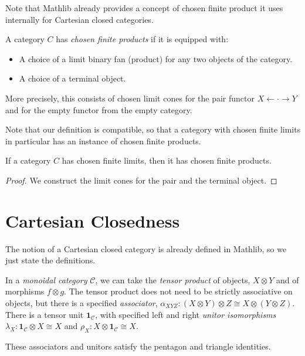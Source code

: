 Note that Mathlib already provides a concept of chosen finite product it uses internally for Cartesian closed categories.

\begin{definition}
  \label{def:chosen-finite-products}
  \mathlibok
  A category $C$ has \emph{chosen finite products} if it is equipped with:
  \begin{itemize}
  \item A choice of a limit binary fan (product) for any two objects of the category.
  \item A choice of a terminal object.
  \end{itemize}
  More precisely, this consists of chosen limit cones for the pair functor $X \leftarrow \cdot \rightarrow Y$ and for the empty functor from the empty category.
\end{definition}

Note that our definition is compatible, so that a category with chosen finite limits in particular has an instance of chosen finite products.

\begin{lemma}
  \label{lem:chosen-finite-products-from-limits}
  \leanok
  If a category $C$ has chosen finite limits, then it has chosen finite products.
\end{lemma}

\begin{proof}
  We construct the limit cones for the pair and the terminal object.
  \leanok
\end{proof}

\section{Cartesian Closedness}

The notion of a Cartesian closed category is already defined in Mathlib, so we just state the definitions.

\begin{definition}
  \label{def:monoidal-category}
  \mathlibok

In a \emph{monoidal category} \(\mathcal{C}\), we can take the \emph{tensor product} of objects, \(X ⊗ Y\) and of morphisms \(f ⊗ g\).
The tensor product does not need to be strictly associative on objects,
but there is a specified \emph{associator}, \(α_{X Y Z} : (X ⊗ Y) ⊗ Z ≅ X ⊗ (Y ⊗ Z)\).
There is a tensor unit \(\mathbf{1}_{\mathcal{C}}\),
with specified left and right \emph{unitor isomorphisms}
\(λ_X : \mathbf{1}_{\mathcal{C}} ⊗ X ≅ X\)
and \(ρ_X : X ⊗ \mathbf{1}_{\mathcal{C}} ≅ X\).

These associators and unitors satisfy the pentagon and triangle identities.
\end{definition}

